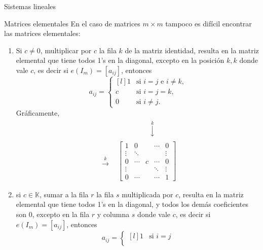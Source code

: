 \documentclass[a4paper,12pt,twoside,spanish]{amsbook}
\theoremstyle{definition}
\theoremstyle{remark}
\newcommand{\K}{\mathbb K}
\begin{document}
\begin{chapter}{Sistemas lineales}
\begin{section}{Matrices elementales}
			En el caso de matrices $m \times m$ tampoco es difícil encontrar las matrices elementales:
			\begin{enumerate}
				\item Si $c \not=0$, multiplicar por  $c$ la fila $k$ de la matriz identidad, resulta en la matriz elemental que tiene todos 1's en la diagonal, excepto en la posición $k,k$ donde vale $c$,  es decir si $e(I_m) = [a_{ij}]$,  entonces
				\begin{equation}\label{elem-tipo-1}
				a_{ij} = \left\{ 
				\begin{matrix*}[l]
				1 &\text{si $i=j$ e $i\ne k$,}\\
				c &\text{si $i=j=k$,} \\
				0 \quad&\text{si $i \ne j$.}
				\end{matrix*}\right.
				\end{equation}
				Gráficamente,
				\begin{align*}
				&\begin{matrix}
				{}^{}&{}^{}&{}^{}&{}^{}&{}^{}&\overset{k}{\downarrow}&{}^{}&{}^{}&{}^{}
				\end{matrix} \\
				\begin{matrix}
				{}^{}\\
				{}^{}\\
				\overset{k}{\to}\\
				{}^{}\\
				{}^{}
				\end{matrix}
				&\begin{bmatrix}
				1 & 0 &  &\cdots & 0  \\
				\vdots  & \ddots  & & & \vdots \\
				0 & \cdots &c &\cdots &0 \\
				\vdots  &   & &\ddots & \vdots \\
				0  & \cdots  & &\cdots & 1
				\end{bmatrix}
				\end{align*}
				\item si  $c \in \K$, sumar a la fila $r$  la fila $s$ multiplicada por $c$, resulta en la matriz elemental que tiene todos 1's en la diagonal, y todos los demás coeficientes son 0,  excepto en la fila  $r$ y columna $s$ donde  vale $c$,  es decir si $e(I_m) = [a_{ij}]$,  entonces
				\begin{equation}\label{elem-tipo-2}
				a_{ij} = \left\{ 
				\begin{matrix*}[l]
				1 &\text{si $i=j$}\\

\end{matrix*}
\end{equation}
\end{enumerate}
\end{section}
\end{chapter}
\end{document}

